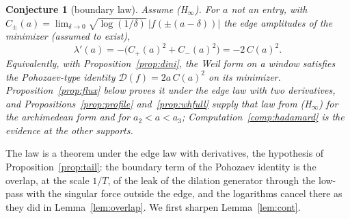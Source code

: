 \documentclass[11pt]{article}
\newtheorem{conjecture}[theorem]{Conjecture}
\theoremstyle{definition}
\theoremstyle{remark}
\begin{document}
\begin{conjecture}[boundary law]\label{conj:hadamard}
Assume (H$_\infty$). For $a$ not an entry, with $C_\pm(a)=\lim_{\delta\to0}\sqrt{\log(1/\delta)}\,|f(\pm(a-\delta))|$ the edge amplitudes of the minimizer (assumed to exist),
\[
\lambda'(a)=-\big(C_+(a)^2+C_-(a)^2\big)=-2\,C(a)^2 .
\]
Equivalently, with Proposition~\ref{prop:dini}, the Weil form on a window satisfies the Pohozaev-type identity
$\mathcal D(f)=2a\,C(a)^2$ on its minimizer. Proposition~\ref{prop:flux} below proves it under the edge law with two derivatives, and Propositions~\ref{prop:profile} and~\ref{prop:whfull} supply that law from (H$_\infty$) for the archimedean form and for $a_2<a<a_3$; Computation~\ref{comp:hadamard} is the evidence at the other supports.
\end{conjecture}

The law is a theorem under the edge law with derivatives, the hypothesis of Proposition~\ref{prop:tail}: the boundary term of the Pohozaev identity is the overlap, at the scale $1/T$, of the leak of the dilation generator through the low-pass with the singular force outside the edge, and the logarithms cancel there as they did in Lemma~\ref{lem:overlap}. We first sharpen Lemma~\ref{lem:cont}.
\end{document}
